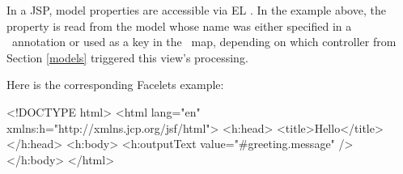 In a JSP, model properties are accessible via EL \cite{el}. In the example above,
the property  is read from the  model whose name
was either specified in a \Named\ annotation or used as a key in the \Models\ map, 
depending on which controller from Section \ref{models} triggered this view's 
processing.

Here is the corresponding Facelets example:
\begin{listing}{1}
<!DOCTYPE html>
<html lang="en" xmlns:h="http://xmlns.jcp.org/jsf/html">
<h:head>
    <title>Hello</title>
</h:head>
<h:body>
    <h:outputText value="#{greeting.message}" />
</h:body>
</html>
\end{listing}

